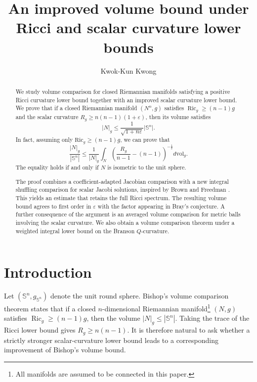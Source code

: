 \documentclass[11pt, reqno]{amsart}
\begin{document}
\title[Volume bound involving Ricci and scalar curvature]{An improved volume bound under Ricci and scalar curvature lower bounds}
\author[K.-K. Kwong]{Kwok-Kun Kwong}
\address{School of Mathematics and Physics\\
University of Wollongong\\
Northfields Ave, Wollongong, NSW $2500$\\
Australia}
\date{}


\maketitle
\begin{abstract}
We study volume comparison for closed Riemannian manifolds satisfying a positive Ricci curvature lower bound together with an improved scalar curvature lower bound.
We prove that if a closed Riemannian manifold $(N^n, g)$ satisfies $\operatorname{Ric}_g\ge (n-1)g$ and the scalar curvature $R_g\ge n(n-1)(1+\varepsilon)$, then its volume satisfies
$$\lvert N\rvert_g \le \frac{1}{\sqrt{1+n\varepsilon}}\lvert\mathbb S^n\rvert. $$
In fact, assuming only $\mathrm{Ric}_g\ge(n-1)g$, we can prove that
$$\frac{|N|_g}{\left|\mathbb{S}^n\right|} \le \frac{1}{|N|_g} \int_N\left(\frac{R_g}{n-1}-(n-1)\right)^{-\frac{1}{2}} d \mathrm{vol}_g. $$
The equality holds if and only if $N$ is isometric to the unit sphere.

The proof combines a coefficient-adapted Jacobian comparison with a new integral shuffling comparison for scalar Jacobi solutions, inspired by Brown and Freedman \cite{BrownFreedman2022}. This yields an estimate that retains the full Ricci spectrum. The resulting volume bound agrees to first order in $\varepsilon$ with the factor appearing in Bray's conjecture. A further consequence of the argument is an averaged volume comparison for metric balls involving the scalar curvature. We also obtain a volume comparison theorem under a weighted integral lower bound on the Branson $Q$-curvature.
\end{abstract}

\section{Introduction}

Let $(\mathbb S^n, g_{\mathbb S^n})$ denote the unit round sphere. Bishop's volume comparison theorem states that if a closed $n$-dimensional Riemannian manifold\footnote{All manifolds are assumed to be connected in this paper.}
$(N, g)$ satisfies $\operatorname{Ric}_g\ge (n-1)g$, then the volume $|N|_g\le |\mathbb S^n|$. Taking the trace of the Ricci lower bound gives $R_g\ge n(n-1)$. It is therefore natural to ask whether a strictly stronger scalar-curvature lower bound leads to a corresponding improvement of Bishop's volume bound.
\end{document}
